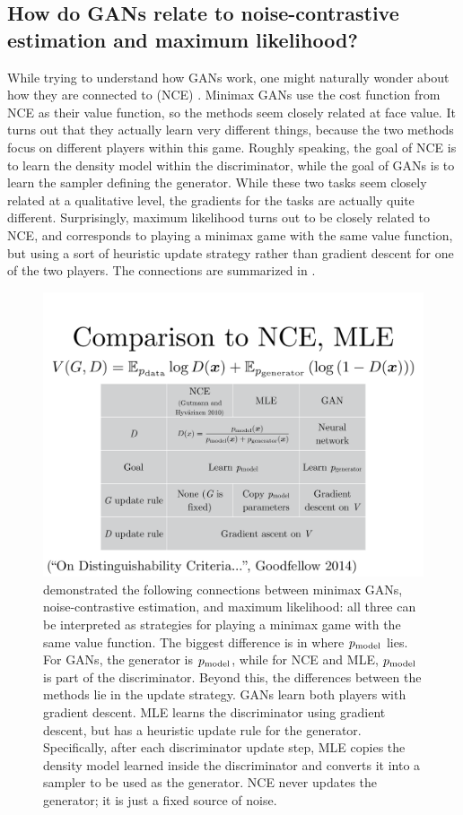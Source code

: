\subsection{How do GANs relate to noise-contrastive estimation and maximum likelihood?}

While trying to understand how GANs work, one might naturally wonder about
how they are connected to  (NCE)
\citep{Gutmann+Hyvarinen-2010}.
Minimax GANs use the cost function from NCE as their value function, so the
methods seem closely related at face value.
It turns out that they actually learn very different things, because the
two methods focus on different players within this game.
Roughly speaking, the goal of NCE is to learn the density model within the
discriminator, while the goal of GANs is to learn the sampler defining
the generator.
While these two tasks seem closely related at a qualitative level, the
gradients for the tasks are actually quite different.
Surprisingly, maximum likelihood turns out to be closely related to NCE,
and corresponds to playing a minimax game with the same value function,
but using a sort of heuristic update strategy rather than gradient descent
for one of the two players.
The connections are summarized in .

\begin{figure}
\centering
\includegraphics[width=\figwidth]{nce}
\caption{
  \citet{Goodfellow-ICLR2015} demonstrated the following
  connections between minimax GANs, noise-contrastive estimation, and
  maximum likelihood: all three can be interpreted as strategies
  for playing a minimax game with the same value function.
  The biggest difference is in where $p_{\rm{model}}$ lies.
  For GANs, the generator is $p_{\rm{model}}$, while for NCE and MLE,
  $p_{\rm{model}}$ is part of the discriminator.
  Beyond this, the differences between the methods lie in the update
  strategy.
  GANs learn both players with gradient descent.
  MLE learns the discriminator using gradient descent, but has a heuristic
  update rule for the generator.
  Specifically, after each discriminator update step, MLE copies the density model learned inside the discriminator and 
  converts it into a sampler to be used as the generator.
  NCE never updates the generator; it is just a fixed source of noise.
}
\label{fig:nce}
\end{figure}
